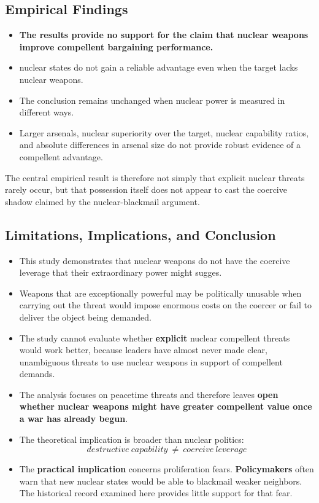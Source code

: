 \subsection{Empirical Findings}
\begin{itemize}
    \item \textbf{The results provide no support for the claim that nuclear weapons improve compellent bargaining performance.}
    \item nuclear states do not gain a reliable advantage even when the target lacks nuclear weapons.
    \item The conclusion remains unchanged when nuclear power is measured in different ways.
    \item Larger arsenals, nuclear superiority over the target, nuclear capability ratios, and absolute differences in arsenal size do not provide robust evidence of a compellent advantage.
\end{itemize}

The central empirical result is therefore not simply that explicit nuclear threats rarely occur, but that possession itself does not appear to cast the coercive shadow claimed by the nuclear-blackmail argument.

\subsection{Limitations, Implications, and Conclusion}
\begin{itemize}
    \item This study demonstrates that nuclear weapons do not have the coercive leverage that their extraordinary power might sugges.
    \item Weapons that are exceptionally powerful may be politically unusable when carrying out the threat would impose enormous costs on the coercer or fail to deliver the object being demanded.
    \item The study cannot evaluate whether \textbf{explicit} nuclear compellent threats would work better, because leaders have almost never made clear, unambiguous threats to use nuclear weapons in support of compellent demands.
    \item The analysis focuses on peacetime threats and therefore leaves \textbf{open whether nuclear weapons might have greater compellent value once a war has already begun}.
    \item The theoretical implication is broader than nuclear politics:
    \[destructive\ capability\ \not =\ coercive\ leverage\]
    \item The \textbf{practical implication} concerns proliferation fears. \textbf{Policymakers} often warn that new nuclear states would be able to blackmail weaker neighbors. The historical record examined here provides little support for that fear.
\end{itemize}
